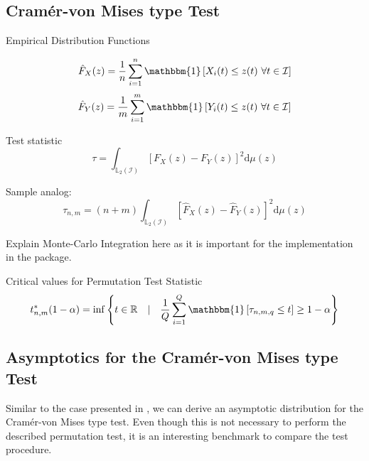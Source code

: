 \documentclass[12pt, a4paper]{article}
\theoremstyle{MAstyle} \newtheorem{assumption}{Assumption}[section]
\theoremstyle{MAstyle} \newtheorem{definition}{Definition}[section]
\theoremstyle{MAstyle} \newtheorem{theorem}{Theorem}[section]
\begin{document}
		\subsection{Cram\'{e}r-von Mises type Test}
		
			Empirical Distribution Functions
			\begin{multicols}{2}
				\noindent
				\begin{equation*}
					\hat{F}_X(z) = \frac{1}{n} \sum_{i = 1}^{n}\mathbbm{1}\left[X_i(t) \leq z(t) \ \forall t \in \mathcal{I}\right]
				\end{equation*}
				\begin{equation}
					\hat{F}_Y(z) = \frac{1}{m} \sum_{i = 1}^{m}\mathbbm{1}\left[Y_i(t) \leq z(t) \ \forall t \in \mathcal{I}\right]
				\end{equation}
			\end{multicols}
			
			
			Test statistic
			\begin{equation}
				\tau = \int_{\mathbb{L}_2(\mathcal{I})}\left[F_X(z) - F_Y(z)\right]^2 \mathrm{d} \mu(z)
			\end{equation}
			
			Sample analog:
			\begin{equation}
				\tau_{n,m} = (n+m) \int_{\mathbb{L}_2(\mathcal{I})}\left[\hat{F}_X(z) - \hat{F}_Y(z)\right]^2 \mathrm{d} \mu(z)
			\end{equation}
		
			{\color{red} Explain Monte-Carlo Integration here as it is important for the implementation in the package.}
		
			Critical values for Permutation Test Statistic
			\begin{equation}
				t^{*}_{n,m}(1-\alpha) = \inf \left\{t \in \mathbb{R} \quad \vert \quad \frac{1}{Q} \sum_{i = 1}^{Q} \mathbbm{1}\left[\tau_{n,m,q} \leq t\right] \geq 1 - \alpha \right\}
			\end{equation}
		
		\subsection{Asymptotics for the Cram\'{e}r-von Mises type Test}
			Similar to the case presented in \cite{bugni_goodness--fit_2009}, we can derive an asymptotic distribution for the Cram\'{e}r-von Mises type test. Even though this is not necessary to perform the described permutation test, it is an interesting benchmark to compare the test procedure. \\
			
\end{document}
